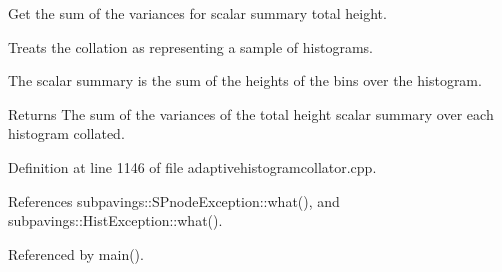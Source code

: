 \-Get the sum of the variances for scalar summary total height. 

\-Treats the collation as representing a sample of histograms.

\-The scalar summary is the sum of the heights of the bins over the histogram.

\begin{DoxyReturn}{\-Returns}
\-The sum of the variances of the total height scalar summary over each histogram collated. 
\end{DoxyReturn}


\-Definition at line 1146 of file adaptivehistogramcollator.\-cpp.



\-References subpavings\-::\-S\-Pnode\-Exception\-::what(), and subpavings\-::\-Hist\-Exception\-::what().



\-Referenced by main().



